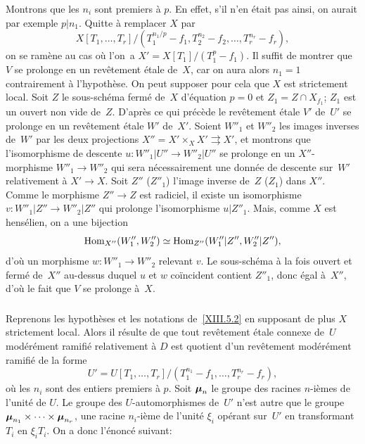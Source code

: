 Montrons que les $n_i$ sont premiers \`a $p$. En effet, s'il n'en
\'etait pas ainsi, on aurait par exemple $p|n_1$. Quitte \`a
remplacer $X$ par
$$X[T_1,\dots,T_r]/(T_1^{n_1/p}-f_1,T_2^{n_2}-f_2,\dots,T_r^{n_r}-f_r),$$
on se ram\`ene au cas o\`u l'on~a $X'=X[T_1]/(T_1^p-f_1)$. Il suffit
de montrer que $V$ se prolonge en un rev\^etement \'etale de~$X$,
car on aura alors $n_1=1$ contrairement \`a l'hypoth\`ese. On peut
supposer pour cela que $X$ est strictement local. Soit $Z$ le
sous-sch\'ema ferm\'e de~$X$ d'\'equation $p=0$ et $Z_1=Z\cap
X_{f_1}$; $Z_1$ est un ouvert non vide de~$Z$. D'apr\`es ce qui
pr\'ec\`ede le rev\^etement \'etale $V'$ de~$U'$ se prolonge
en un rev\^etement \'etale $W'$ de~$X'$. Soient $W''_1$ et $W''_2$
les images inverses de~$W'$ par les deux projections $X''=X'\times_X
X'\rightrightarrows X'$, et montrons que l'isomorphisme de descente
$u\colon W''_1|U''\to W''_2|U''$ se prolonge en un $X''$-morphisme
$W''_1\to W''_2$ qui sera n\'ecessairement une donn\'ee de
descente sur~$W'$ relativement \`a $X'\to X$. Soit $Z''$
(\resp $Z''_1$) l'image inverse de~$Z$ (\resp $Z_1$) dans $X''$. Comme
le morphisme $Z''\to Z$ est radiciel, il existe un isomorphisme
$v\colon W''_1|Z''\to W''_2|Z''$ qui prolonge l'isomorphisme
$u|Z''_1$. Mais, comme $X$ est hens\'elien, on a une bijection
$$
\operatorname{Hom}_{X''}(W''_1,W''_2)\simeq\operatorname{Hom}_{Z''}(W''_1|Z'',W_2''|Z''),
$$
d'o\`u un morphisme $w\colon W''_1\to W''_2$ relevant $v$. Le
sous-sch\'ema \`a la fois ouvert
et ferm\'e de~$X''$ au-dessus duquel $u$ et $w$ co\"incident
contient $Z''_1$, donc \'egal \`a~$X''$, d'o\`u le fait que $V$
se prolonge \`a~$X$.

\setcounter{subsection}{3} \setcounter{subsubsection}{-1}

\subsubsection{}
\label{XIII.5.3.0} Reprenons les hypoth\`eses et les notations
de~\ref{XIII.5.2} en supposant de plus
$X$
strictement local. Alors
il r\'esulte de \loccit que tout rev\^etement \'etale connexe
de~$U$ mod\'er\'ement ramifi\'e relativement \`a $D$ est
quotient d'un rev\^etement mod\'er\'ement ramifi\'e de la
forme
$$
U'=U[T_1,\dots,T_r]/(T_1^{n_1}-f_1,\dots,T_r^{n_r}-f_r),
$$
o\`u les $n_i$ sont des entiers premiers \`a $p$. Soit
$\boldsymbol{\mu}_n$ le groupe des racines $n$-i\`emes de l'unit\'e de
$U$. Le groupe des $U$-automorphismes de~$U'$ n'est autre que le
groupe $\boldsymbol{\mu}_{n_1}\times\dots\times\boldsymbol{\mu}_{n_r}$, une racine
$n_i$-i\`eme de l'unit\'e $\xi_i$ op\'erant sur~$U'$ en
transformant $T_i$ en $\xi_i T_i$. On a donc l'\'enonc\'e suivant:

